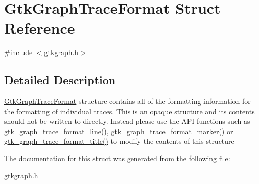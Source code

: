 \hypertarget{struct_gtk_graph_trace_format}{
\section{GtkGraphTraceFormat Struct Reference}
\label{struct_gtk_graph_trace_format}
}


{\ttfamily \#include $<$gtkgraph.h$>$}



\subsection{Detailed Description}
\hyperlink{struct_gtk_graph_trace_format}{GtkGraphTraceFormat} structure contains all of the formatting information for the formatting of individual traces. This is an opaque structure and its contents should not be written to directly. Instead please use the API functions such as \hyperlink{gtkgraph_8h_a0006dc30b139c49bfe454eee512c0754}{gtk\_\-graph\_\-trace\_\-format\_\-line()}, \hyperlink{gtkgraph_8h_a6d76b02b2e2db42af55cd3dd8a3df357}{gtk\_\-graph\_\-trace\_\-format\_\-marker()} or \hyperlink{gtkgraph_8h_ad81fd5d72e63d30a708d05707a657996}{gtk\_\-graph\_\-trace\_\-format\_\-title()} to modify the contents of this structure 

The documentation for this struct was generated from the following file:\begin{DoxyCompactItemize}
\item 
\hyperlink{gtkgraph_8h}{gtkgraph.h}\end{DoxyCompactItemize}
